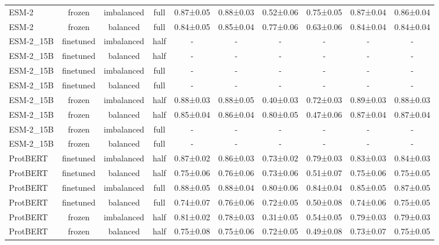 \begin{tabular}{lccccccccc}
       ESM-2 &         frozen & imbalanced &      full & 0.87±0.05 & 0.88±0.03 & 0.52±0.06 & 0.75±0.05 & 0.87±0.04 & 0.86±0.04 \\
       ESM-2 &         frozen &   balanced &      full & 0.84±0.05 & 0.85±0.04 & 0.77±0.06 & 0.63±0.06 & 0.84±0.04 & 0.84±0.04 \\
   ESM-2\_15B &      finetuned & imbalanced &      half &         - &         - &         - &         - &         - &         - \\
   ESM-2\_15B &      finetuned &   balanced &      half &         - &         - &         - &         - &         - &         - \\
   ESM-2\_15B &      finetuned & imbalanced &      full &         - &         - &         - &         - &         - &         - \\
   ESM-2\_15B &      finetuned &   balanced &      full &         - &         - &         - &         - &         - &         - \\
   ESM-2\_15B &         frozen & imbalanced &      half & 0.88±0.03 & 0.88±0.05 & 0.40±0.03 & 0.72±0.03 & 0.89±0.03 & 0.88±0.03 \\
   ESM-2\_15B &         frozen &   balanced &      half & 0.85±0.04 & 0.86±0.04 & 0.80±0.05 & 0.47±0.06 & 0.87±0.04 & 0.87±0.04 \\
   ESM-2\_15B &         frozen & imbalanced &      full &         - &         - &         - &         - &         - &         - \\
   ESM-2\_15B &         frozen &   balanced &      full &         - &         - &         - &         - &         - &         - \\
    ProtBERT &      finetuned & imbalanced &      half & 0.87±0.02 & 0.86±0.03 & 0.73±0.02 & 0.79±0.03 & 0.83±0.03 & 0.84±0.03 \\
    ProtBERT &      finetuned &   balanced &      half & 0.75±0.06 & 0.76±0.06 & 0.73±0.06 & 0.51±0.07 & 0.75±0.06 & 0.75±0.05 \\
    ProtBERT &      finetuned & imbalanced &      full & 0.88±0.05 & 0.88±0.04 & 0.80±0.06 & 0.84±0.04 & 0.85±0.05 & 0.87±0.05 \\
    ProtBERT &      finetuned &   balanced &      full & 0.74±0.07 & 0.76±0.06 & 0.72±0.05 & 0.50±0.08 & 0.74±0.06 & 0.75±0.05 \\
    ProtBERT &         frozen & imbalanced &      half & 0.81±0.02 & 0.78±0.03 & 0.31±0.05 & 0.54±0.05 & 0.79±0.03 & 0.79±0.03 \\
    ProtBERT &         frozen &   balanced &      half & 0.75±0.08 & 0.75±0.06 & 0.72±0.05 & 0.49±0.08 & 0.73±0.07 & 0.75±0.05 \\

\end{tabular}
